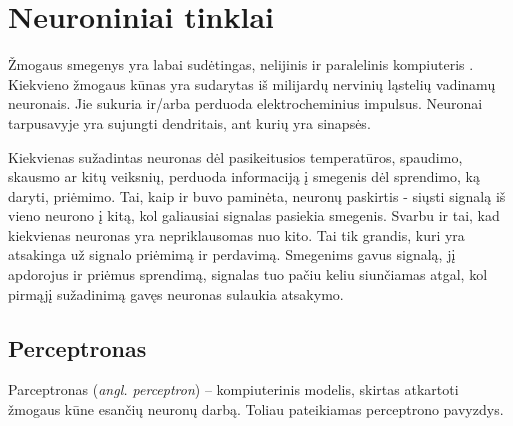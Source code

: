 \documentclass{VUMIFPSbakalaurinis}
\begin{document}
\section{Neuroniniai tinklai}
Žmogaus smegenys yra labai sudėtingas, nelijinis ir paralelinis kompiuteris \cite{Hay09}. Kiekvieno žmogaus kūnas yra sudarytas iš milijardų nervinių ląstelių vadinamų neuronais. Jie sukuria ir/arba perduoda elektrocheminius impulsus. Neuronai tarpusavyje yra sujungti dendritais, ant kurių yra sinapsės. 

Kiekvienas sužadintas neuronas dėl pasikeitusios temperatūros, spaudimo, skausmo ar kitų veiksnių, perduoda informaciją į smegenis dėl sprendimo, ką daryti, priėmimo. Tai, kaip ir buvo paminėta, neuronų paskirtis - siųsti signalą iš vieno neurono į kitą, kol galiausiai signalas pasiekia smegenis. Svarbu ir tai, kad kiekvienas neuronas yra nepriklausomas nuo kito. Tai tik grandis, kuri yra atsakinga už signalo priėmimą ir perdavimą. Smegenims gavus signalą, jį apdorojus ir priėmus sprendimą, signalas tuo pačiu keliu siunčiamas atgal, kol pirmąjį sužadinimą gavęs neuronas sulaukia atsakymo. 

\subsection{Perceptronas}

Parceptronas (\textit{angl. perceptron}) – kompiuterinis modelis, skirtas atkartoti žmogaus kūne esančių neuronų darbą. Toliau pateikiamas perceptrono pavyzdys.
\end{document}
